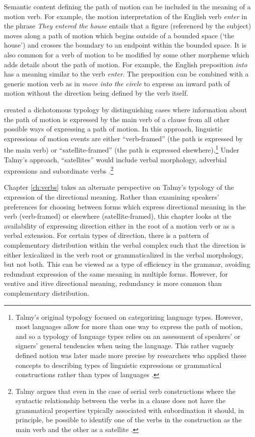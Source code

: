 Semantic content defining the path of motion can be included in the meaning of a motion verb. For example, the motion interpretation of the English verb \textit{enter} in the phrase \textit{They entered the house} entails that a figure (referenced by the subject) moves along a path of motion which begins outside of a bounded space (`the house') and crosses the boundary to an endpoint within the bounded space. It is also common for a verb of motion to be modified by some other morpheme which adds details about the path of motion. For example, the English preposition \textit{into} has a meaning similar to the verb \textit{enter}. The preposition can be combined with a generic motion verb as in \textit{move into the circle} to express an inward path of motion without the direction being defined by the verb itself.

\citet{talmyPathRealizationTypology1991} created a dichotomous typology by distinguishing cases where information about the path of motion is expressed by the main verb of a clause from all other possible ways of expressing a path of motion. In this approach, linguistic expressions of motion events are either ``verb-framed'' (the path is expressed by the main verb) or ``satellite-framed'' (the path is expressed elsewhere).\footnote{Talmy's original typology focused on categorizing language types. However, most languages allow for more than one way to express the path of motion, and so a typology of language types relies on an assessment of speakers' or signers' general tendencies when using the language. This rather vaguely defined notion was later made more precise by researchers who applied these concepts to describing types of linguistic expressions or grammatical constructions rather than types of languages \citep[e.g.][]{beaversTypologyMotionExpressions2010,croftRevisingTalmyTypological2010}.} Under Talmy's approach, ``satellites'' would include verbal morphology, adverbial expressions and subordinate verbs \citep[103]{talmyCognitiveSemantics2000}.\footnote{Talmy argues that even in the case of serial verb constructions where the syntactic relationship between the verbs in a clause does not have the grammatical properties typically associated with subordination it should, in principle, be possible to identify one of the verbs in the construction as the main verb and the other as a satellite \citep{talmyPropertiesMainVerbs2016}.}

Chapter \ref{ch:verbs} takes an alternate perspective on Talmy's typology of the expression of the directional meaning. Rather than examining speakers' preferences for choosing between forms which express directional meaning in the verb (verb-framed) or elsewhere (satellite-framed), this chapter looks at the availability of expressing direction either in the root of a motion verb or as a verbal extension. For certain types of direction, there is a pattern of complementary distribution within the verbal complex such that the direction is either lexicalized in the verb root or grammaticalized in the verbal morphology, but not both. This can be viewed as a type of efficiency in the grammar, avoiding redundant expression of the same meaning in multiple forms. However, for ventive and itive directional meaning, redundancy is more common than complementary distribution. 


